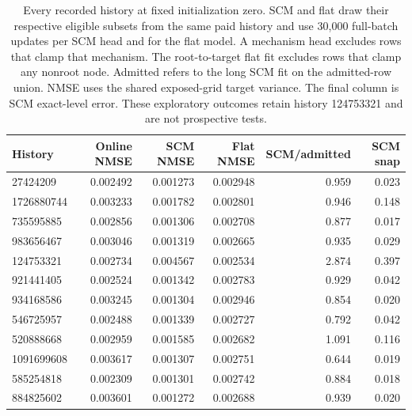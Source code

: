 \begin{table}[ht]
\centering\small
\begin{tabular}{lrrrrr}
\toprule
History & Online NMSE & SCM NMSE & Flat NMSE & SCM/admitted & SCM snap\\
\midrule
27424209 & 0.002492 & 0.001273 & 0.002948 & 0.959 & 0.023\\
1726880744 & 0.003233 & 0.001782 & 0.002801 & 0.946 & 0.148\\
735595885 & 0.002856 & 0.001306 & 0.002708 & 0.877 & 0.017\\
983656467 & 0.003046 & 0.001319 & 0.002665 & 0.935 & 0.029\\
124753321 & 0.002734 & 0.004567 & 0.002534 & 2.874 & 0.397\\
921441405 & 0.002524 & 0.001342 & 0.002783 & 0.929 & 0.042\\
934168586 & 0.003245 & 0.001304 & 0.002946 & 0.854 & 0.020\\
546725957 & 0.002488 & 0.001339 & 0.002727 & 0.792 & 0.042\\
520888668 & 0.002959 & 0.001585 & 0.002682 & 1.091 & 0.116\\
1091699608 & 0.003617 & 0.001307 & 0.002751 & 0.644 & 0.019\\
585254818 & 0.002309 & 0.001301 & 0.002742 & 0.884 & 0.018\\
884825602 & 0.003601 & 0.001272 & 0.002688 & 0.939 & 0.020\\
\bottomrule
\end{tabular}
\caption{Every recorded history at fixed initialization zero. SCM and flat draw their respective eligible subsets from the same paid history and use 30,000 full-batch updates per SCM head and for the flat model. A mechanism head excludes rows that clamp that mechanism. The root-to-target flat fit excludes rows that clamp any nonroot node. Admitted refers to the long SCM fit on the admitted-row union. NMSE uses the shared exposed-grid target variance. The final column is SCM exact-level error. These exploratory outcomes retain history 124753321 and are not prospective tests.}
\label{tab:attribution-histories}
\end{table}


